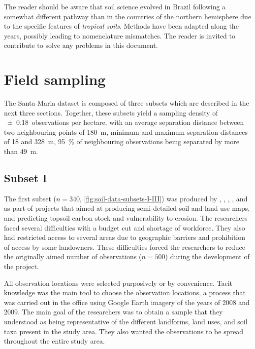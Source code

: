 The reader should be aware that soil science evolved in Brazil following a somewhat different 
pathway than in the countries of the northern hemisphere due to the specific features of 
\emph{tropical soils}. Methods have been adapted along the years, possibly leading to nomenclature 
mismatches. The reader is invited to contribute to solve any problems in this document.

\tocless\section{Field sampling}

The Santa Maria dataset is composed of three subsets which are described in the next three 
sections. Together, these subsets yield a sampling density of \num{\pm0.18}~observations per 
hectare, with an average separation distance between two neighbouring points of \SI{180}{\metre}, 
minimum and maximum separation distances of \num{18} and \SI{328}{\metre}, \SI{95}{\percent} of 
neighbouring observations being separated by more than \SI{49}{\metre}.

\tocless\subsection{Subset I}

The first subset ($n = 340$, \autoref{fig:soil-data-subsets-I-III}) was produced by 
, , , 
, and  as part of projects that aimed at 
producing semi-detailed soil and land use maps, and predicting topsoil carbon stock and vulnerability to 
erosion. The researchers faced several difficulties with a budget cut and shortage of workforce. They also had 
restricted access to several areas due to geographic barriers and prohibition of 
access by some landowners. These difficulties forced the researchers to reduce the originally aimed number of 
observations ($n = 500$) during the development of the project.

All observation locations were selected purposively or by convenience. Tacit knowledge was the main tool
to choose the observation locations, a process that was carried out in the office using Google 
Earth\textregistered{} imagery of the years of 2008 and 2009. The main goal of the researchers was 
to obtain a sample that they understood as being representative of the different landforms, land uses, and 
soil taxa present in the study area. They also wanted the observations to be spread throughout the entire 
study area.

